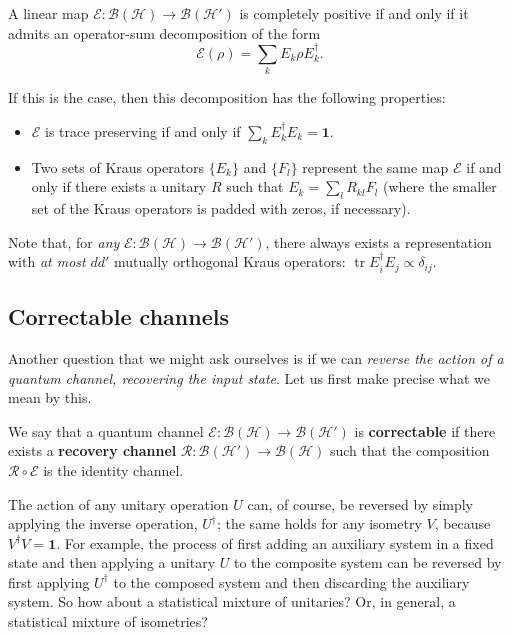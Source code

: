 \documentclass[fleqn]{article}
\providecommand{\tightlist}{%
  \setlength{\itemsep}{0pt}\setlength{\parskip}{0pt}}
\newenvironment{idea}{\noindent}{\medskip}
\begin{document}
\begin{idea}

A linear map \(\mathcal{E}\colon\mathcal{B}(\mathcal{H})\to\mathcal{B}(\mathcal{H}')\) is completely positive if and only if it admits an operator-sum decomposition of the form
\[
  \mathcal{E}(\rho) = \sum_k E_k\rho E^\dagger_k.
\]

If this is the case, then this decomposition has the following properties:

\begin{itemize}
\tightlist
\item
  \(\mathcal{E}\) is trace preserving if and only if \(\sum_k E^\dagger_kE_k=\mathbf{1}\).
\item
  Two sets of Kraus operators \(\{E_k\}\) and \(\{F_l\}\) represent the same map \(\mathcal{E}\) if and only if there exists a unitary \(R\) such that \(E_k =\sum_l R_{kl}F_l\) (where the smaller set of the Kraus operators is padded with zeros, if necessary).
\end{itemize}


\end{idea}

Note that, for \emph{any} \(\mathcal{E}\colon\mathcal{B}(\mathcal{H})\to\mathcal{B}(\mathcal{H}')\), there always exists a representation with \emph{at most} \(dd'\) mutually orthogonal Kraus operators: \(\operatorname{tr}E^\dagger_iE_j\propto\delta_{ij}\).

\hypertarget{correctable-channels}{%
\subsection{Correctable channels}\label{correctable-channels}}

Another question that we might ask ourselves is if we can \emph{reverse the action of a quantum channel, recovering the input state}.
Let us first make precise what we mean by this.

\begin{idea}
We say that a quantum channel \(\mathcal{E}\colon\mathcal{B}(\mathcal{H})\to\mathcal{B}(\mathcal{H}')\) is \textbf{correctable} if there exists a \textbf{recovery channel} \(\mathcal{R}\colon\mathcal{B}(\mathcal{H}')\to\mathcal{B}(\mathcal{H})\) such that the composition \(\mathcal{R}\circ\mathcal{E}\) is the identity channel.

\end{idea}

The action of any unitary operation \(U\) can, of course, be reversed by simply applying the inverse operation, \(U^\dagger\);
the same holds for any isometry \(V\), because \(V^\dagger V=\mathbf{1}\).
For example, the process of first adding an auxiliary system in a fixed state and then applying a unitary \(U\) to the composite system can be reversed by first applying \(U^\dagger\) to the composed system and then discarding the auxiliary system.
So how about a statistical mixture of unitaries?
Or, in general, a statistical mixture of isometries?
\end{document}

